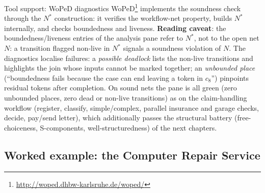 \begin{notebox}{Tool support: WoPeD diagnostics}
WoPeD\footnote{\url{http://woped.dhbw-karlsruhe.de/woped/}} implements the soundness check through the $N^*$ construction: it verifies the workflow-net property, builds $N^*$ internally, and checks boundedness and liveness. \textbf{Reading caveat}: the boundedness/liveness entries of the analysis pane refer to $N^*$, not to the open net $N$: a transition flagged non-live in $N^*$ signals a soundness violation of $N$. The diagnostics localise failures: a \emph{possible deadlock} lists the non-live transitions and highlights the join whose inputs cannot be marked together; an \emph{unbounded place} (``boundedness fails because the case can end leaving a token in $c_8$'') pinpoints residual tokens after completion. On sound nets the pane is all green (zero unbounded places, zero dead or non-live transitions) as on the claim-handling workflow (register, classify, simple/complex, parallel insurance and garage checks, decide, pay/send letter), which additionally passes the structural battery (free-choiceness, S-components, well-structuredness) of the next chapters.
\end{notebox}

\subsection{Worked example: the Computer Repair Service}

